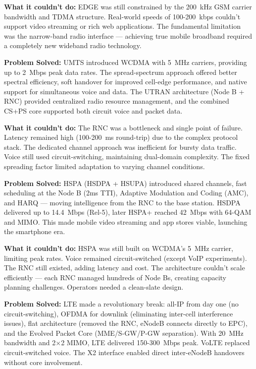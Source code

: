 \textbf{What it couldn’t do:} EDGE was still constrained by the 200~kHz GSM carrier bandwidth and TDMA structure. Real-world speeds of 100-200~kbps couldn’t support video streaming or rich web applications. The fundamental limitation was the narrow-band radio interface — achieving true mobile broadband required a completely new wideband radio technology.


\textbf{Problem Solved:} UMTS introduced WCDMA with 5~MHz carriers, providing up to 2~Mbps peak data rates. The spread-spectrum approach offered better spectral efficiency, soft handover for improved cell-edge performance, and native support for simultaneous voice and data. The UTRAN architecture (Node B + RNC) provided centralized radio resource management, and the combined CS+PS core supported both circuit voice and packet data.

\textbf{What it couldn’t do:} The RNC was a bottleneck and single point of failure. Latency remained high (100-200~ms round-trip) due to the complex protocol stack. The dedicated channel approach was inefficient for bursty data traffic. Voice still used circuit-switching, maintaining dual-domain complexity. The fixed spreading factor limited adaptation to varying channel conditions.


\textbf{Problem Solved:} HSPA (HSDPA + HSUPA) introduced shared channels, fast scheduling at the Node B (2ms TTI), Adaptive Modulation and Coding (AMC), and HARQ — moving intelligence from the RNC to the base station. HSDPA delivered up to 14.4~Mbps (Rel-5), later HSPA+ reached 42~Mbps with 64-QAM and MIMO. This made mobile video streaming and app stores viable, launching the smartphone era.

\textbf{What it couldn’t do:} HSPA was still built on WCDMA’s 5~MHz carrier, limiting peak rates. Voice remained circuit-switched (except VoIP experiments). The RNC still existed, adding latency and cost. The architecture couldn’t scale efficiently — each RNC managed hundreds of Node Bs, creating capacity planning challenges. Operators needed a clean-slate design.


\textbf{Problem Solved:} LTE made a revolutionary break: all-IP from day one (no circuit-switching), OFDMA for downlink (eliminating inter-cell interference issues), flat architecture (removed the RNC, eNodeB connects directly to EPC), and the Evolved Packet Core (MME/\allowbreak{}S-GW/\allowbreak{}P-GW separation). With 20~MHz bandwidth and 2\ensuremath{\times}2 MIMO, LTE delivered 150-300~Mbps peak. VoLTE replaced circuit-switched voice. The X2 interface enabled direct inter-eNodeB handovers without core involvement.


